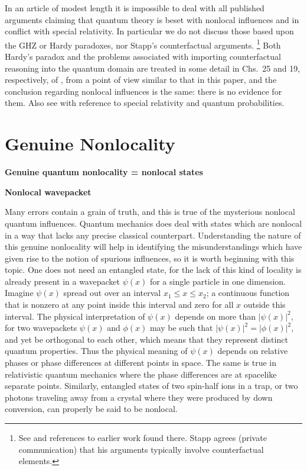 \documentclass[10pt]{article} %
\def\outl#1{\par{\medskip\noindent\hspace*{.5cm}\bf
      \mathversion{bold}#1\mathversion{normal}\smallskip} }
\def\np{} \def\xa{} \def\xb{} \def\xn{} \def\xp{}
\def\outl#1{} \def\np{} \def\xa{} \def\xb{} \def\xn{} \def\xp{}
\def\outl#1{\par{\medskip\noindent\hspace*{.5cm}\bf
      \mathversion{bold}#1\mathversion{normal}\smallskip} }
\def\np{\newpage }\def\xn{\nopagebreak }\def\xp{\pagebreak }
\begin{document}
In an article of modest length it is impossible to deal with all published
arguments claiming that quantum theory is beset with nonlocal influences and
in conflict with special relativity.  In particular we do not discuss those
based upon the GHZ \cite{GrHZ89,GHSZ90} or Hardy \cite{Hrdy92} paradoxes, nor
Stapp's counterfactual arguments.%
\footnote{See \cite{Stpp06} and references to earlier work found there.  Stapp
  agrees (private communication) that his arguments typically involve
  counterfactual elements.} %
Both Hardy's paradox and the problems associated with importing counterfactual
reasoning into the quantum domain are treated in some detail in Chs.~25 and
19, respectively, of \cite{Grff02c}, from a point of view similar to that in
this paper, and the conclusion regarding nonlocal influences is the same:
there is no evidence for them.  Also see \cite{Grff02b} with reference to
special relativity and quantum probabilities.

\xb
\section{Genuine Nonlocality}
\label{sct2}
\xa

\xb
\outl{Genuine quantum nonlocality = nonlocal states}
\xa


\xb
\outl{Nonlocal wavepacket}
\xa







Many errors contain a grain of truth, and this is true of the
mysterious nonlocal quantum influences. Quantum mechanics does
deal with states which are nonlocal in a way that lacks any precise classical
counterpart.  Understanding the nature of this genuine nonlocality will help
in identifying the misunderstandings which have given rise to the notion of
spurious  influences, so it is worth beginning with this topic. 
%
One does not need an entangled state, for the lack of this kind of locality is
already present in a wavepacket $\psi(x)$ for a single particle in one
dimension.  Imagine $\psi(x)$ spread out over an interval $x_1\leq x\leq x_2$;
a continuous function that is nonzero at any point inside this interval and
zero for all $x$ outside this interval.  The physical interpretation of
$\psi(x)$ depends on more than $|\psi(x)|^2$, for two wavepackets $\psi(x)$
and $\phi(x)$ may be such that $|\psi(x)|^2=|\phi(x)|^2$, and yet be
orthogonal to each other, which means that they represent distinct quantum
properties.  Thus the physical meaning of $\psi(x)$ depends on relative phases
or phase differences at different points in space.  The same is true in
relativistic quantum mechanics where the phase differences are at spacelike
separate points.  Similarly, entangled states of two spin-half ions in a trap,
or two photons traveling away from a crystal where they were produced by down
conversion, can properly be said to be nonlocal.
\end{document}
